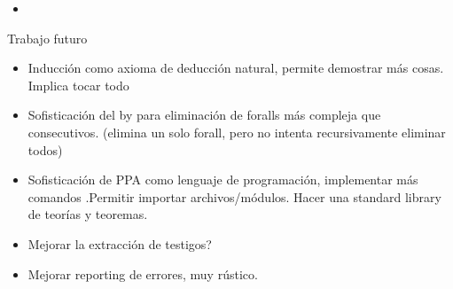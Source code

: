 \begin{itemize}
    \item {}
\end{itemize}

Trabajo futuro

\begin{itemize}
    \item Inducción como axioma de deducción natural, permite demostrar más
    cosas. Implica tocar todo
    \item Sofisticación del by para eliminación de foralls más compleja que
    consecutivos. (elimina un solo forall, pero no intenta recursivamente
    eliminar todos)
    \item Sofisticación de PPA como lenguaje de programación, implementar más
    comandos .Permitir importar archivos/módulos. Hacer una standard library
    de teorías y teoremas. 
    \item Mejorar la extracción de testigos?
    \item Mejorar reporting de errores, muy rústico.
\end{itemize}